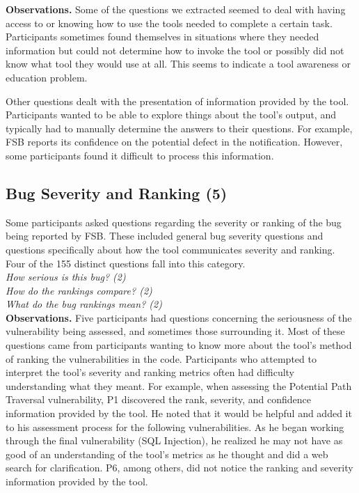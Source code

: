 \documentclass[conference]{IEEEtran}
\begin{document}
\noindent\textbf{Observations.}
Some of the questions we extracted seemed to deal with having access to or knowing how to use the tools needed to complete a certain task. 
Participants sometimes found themselves in situations where they needed information but could not determine how to invoke the tool or possibly did not know what tool they would use at all. 
This seems to indicate a tool awareness or education problem.

Other questions dealt with the presentation of information provided by the tool. 
Participants wanted to be able to explore things about the tool's output, and typically had to manually determine the answers to their questions. 
For example, FSB reports its confidence on the potential defect in the notification. 
However, some participants found it difficult to process this information.
\\




\noindent\subsection{\textbf{Bug Severity and Ranking (5)}}\label{bsr}

Some participants asked questions regarding the severity or ranking of the bug being reported by FSB. 
These included general bug severity questions and questions specifically about how the tool communicates severity and ranking. 
Four of the 155 distinct questions fall into this category. 
\\

\noindent\emph{How serious is this bug? (2)} \\
\emph{How do the rankings compare? (2)} \\
\emph{What do the bug rankings mean? (2)} \\

\noindent\textbf{Observations.}
Five participants had questions concerning the seriousness of the vulnerability being assessed, and sometimes those surrounding it. 
Most of these questions came from participants wanting to know more about the tool's method of ranking the vulnerabilities in the code.
Participants who attempted to interpret the tool's severity and ranking metrics often had difficulty understanding what they meant. 
For example, when assessing the Potential Path Traversal vulnerability, P1 discovered the rank, severity, and confidence information provided by the tool. 
He noted that it would be helpful and added it to his assessment process for the following vulnerabilities.
As he began working through the final vulnerability (SQL Injection), he realized he may not have as good of an understanding of the tool's metrics as he thought and did a web search for clarification. 
P6, among others, did not notice the ranking and severity information provided by the tool. 
\\
\end{document}
